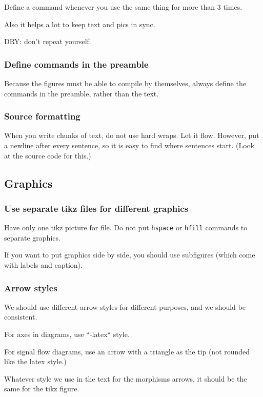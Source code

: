 Define a command whenever you use the same thing for more than 3 times.

Also it helps a lot to keep text and pics in sync.

DRY: don't repeat yourself.



\subsubsection*{Define commands in the preamble }

Because the figures must be able to compile by themselves, always define the commands in the preamble, rather than the text.



\subsubsection*{Source formatting}

When you write chunks of text, do not use hard wraps. %
Let it flow. %
However, put a newline after every sentence, so it is easy to find where sentences start.
(Look at the source code for this.)


\subsection*{Graphics}

\subsubsection*{Use separate tikz files for different graphics}

Have only one tikz picture for file. Do not put \texttt{hspace} or \texttt{hfill} commands to separate graphics.


If you want to put graphics side by side, you should use subfigures (which come with labels and caption).


\subsubsection*{Arrow styles}

We should use different arrow styles for different purposes,
and we should be consistent.

For axes in diagrams, use ``-latex`` style.

For signal flow diagrams, use an arrow with a triangle as the tip (not rounded like the latex style.)

Whatever style we use in the text for the morphisms arrows, it should be the
same for the tikz figure.






